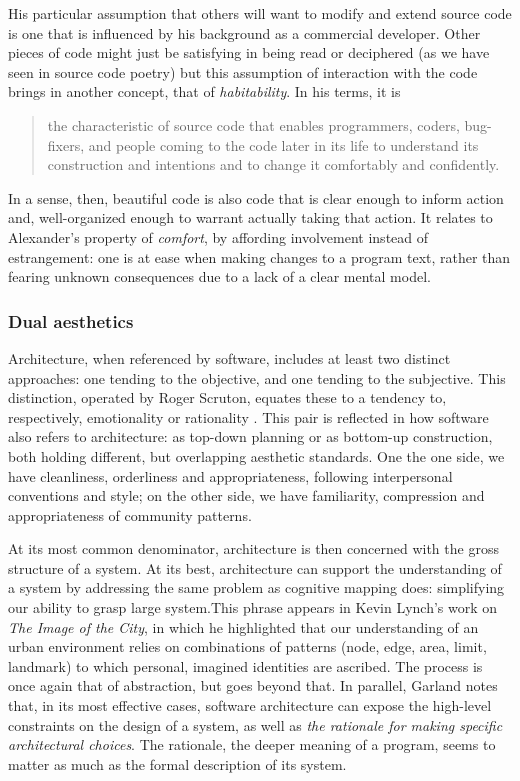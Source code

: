 His particular assumption that others will want to modify and extend source code is one that is influenced by his background as a commercial developer. Other pieces of code might just be satisfying in being read or deciphered (as we have seen in source code poetry) but this assumption of interaction with the code brings in another concept, that of \emph{habitability}. In his terms, it is

\begin{quote}
  the characteristic of source code that enables programmers, coders, bug-fixers, and people coming to the code later in its life to understand its construction and intentions and to change it comfortably and confidently. \citep{gabriel_patterns_1998}
\end{quote}

In a sense, then, beautiful code is also code that is clear enough to inform action and, well-organized enough to warrant actually taking that action. It relates to Alexander's property of \emph{comfort}, by affording involvement instead of estrangement: one is at ease when making changes to a program text, rather than fearing unknown consequences due to a lack of a clear mental model.

\subsubsection{Dual aesthetics}

Architecture, when referenced by software, includes at least two distinct approaches: one tending to the objective, and one tending to the subjective. This distinction, operated by Roger Scruton, equates these to a tendency to, respectively, emotionality or rationality \citep{scruton_aesthetics_2013}. This pair is reflected in how software also refers to architecture: as top-down planning or as bottom-up construction, both holding different, but overlapping aesthetic standards. One the one side, we have cleanliness, orderliness and appropriateness, following interpersonal conventions and style; on the other side, we have familiarity, compression and appropriateness of community patterns.

At its most common denominator, architecture is then concerned with the gross structure of a system. At its best, architecture can support the understanding of a system by addressing the same problem as cognitive mapping does: simplifying our ability to grasp large system.This phrase appears in Kevin Lynch's work on \emph{The Image of the City}, in which he highlighted that our understanding of an urban environment relies on combinations of patterns (node, edge, area, limit, landmark) to which personal, imagined identities are ascribed. The process is once again that of abstraction, but goes beyond that. In parallel, Garland notes that, in its most effective cases, software architecture can expose the high-level constraints on the design of a system, as well as \emph{the rationale for making specific architectural choices}. The rationale, the deeper meaning of a program, seems to matter as much as the formal description of its system.

